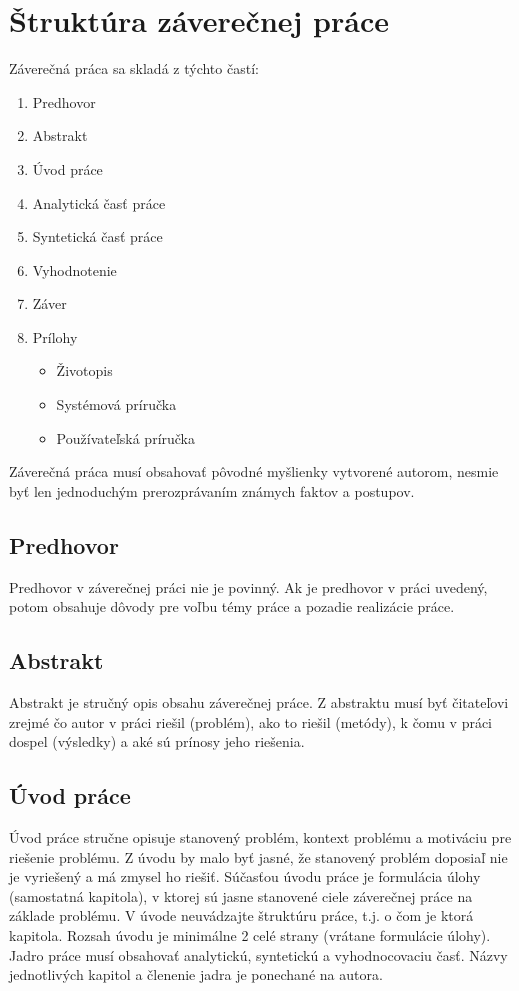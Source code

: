 \section{Štruktúra záverečnej práce}

Záverečná práca sa skladá z týchto častí:

\begin{enumerate}
    \item Predhovor
    \item Abstrakt
    \item Úvod práce
    \item Analytická časť práce
    \item Syntetická časť práce
    \item Vyhodnotenie
    \item Záver
	\item Prílohy
	\begin{itemize}
	    \item Životopis
	    \item Systémová príručka
	    \item Používateľská príručka
	\end{itemize}
\end{enumerate}

Záverečná práca musí obsahovať pôvodné myšlienky vytvorené autorom, nesmie byť len jednoduchým prerozprávaním známych faktov a postupov.

\subsection{Predhovor}

Predhovor v záverečnej práci nie je povinný. Ak je predhovor v práci uvedený, potom obsahuje dôvody pre
voľbu témy práce a pozadie realizácie práce.

\subsection{Abstrakt}

Abstrakt je stručný opis obsahu záverečnej práce. Z abstraktu musí byť čitateľovi zrejmé čo autor v práci
riešil (problém), ako to riešil (metódy), k čomu v práci dospel (výsledky) a aké sú prínosy jeho riešenia.

\subsection{Úvod práce}

Úvod práce stručne opisuje stanovený problém, kontext problému a motiváciu pre riešenie problému. Z úvodu by malo byť jasné, že stanovený problém doposiaľ nie je vyriešený a má zmysel ho riešiť. Súčasťou úvodu práce je formulácia úlohy (samostatná kapitola), v ktorej sú jasne stanovené ciele záverečnej práce na základe problému. V úvode neuvádzajte štruktúru práce, t.j. o čom je ktorá kapitola. Rozsah úvodu je minimálne 2 celé strany (vrátane formulácie úlohy). Jadro práce musí obsahovať analytickú, syntetickú a vyhodnocovaciu časť. Názvy jednotlivých kapitol a členenie jadra je ponechané na autora.
    
